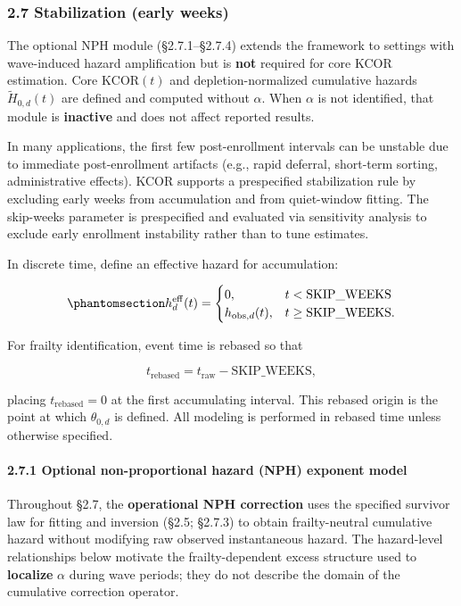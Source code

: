\documentclass[
]{article}
\begin{document}
\subsubsection{2.7 Stabilization (early weeks)}\label{stabilization-early-weeks}

The optional NPH module (§2.7.1--§2.7.4) extends the framework to settings with wave-induced hazard amplification but is \textbf{not} required for core KCOR estimation. Core \(\mathrm{KCOR}(t)\) and depletion-normalized cumulative hazards \(\tilde H_{0,d}(t)\) are defined and computed without \(\alpha\). When \(\alpha\) is not identified, that module is \textbf{inactive} and does not affect reported results.

In many applications, the first few post-enrollment intervals can be unstable due to immediate post-enrollment artifacts (e.g., rapid deferral, short-term sorting, administrative effects). KCOR supports a prespecified stabilization rule by excluding early weeks from accumulation and from quiet-window fitting. The skip-weeks parameter is prespecified and evaluated via sensitivity analysis to exclude early enrollment instability rather than to tune estimates.

In discrete time, define an effective hazard for accumulation:

\begin{equation}\protect\phantomsection\label{eq:effective-hazard-skip}{h_d^{\mathrm{eff}}(t)=
\begin{cases}
0, & t < \mathrm{SKIP\_WEEKS} \\
h_{\mathrm{obs},d}(t), & t \ge \mathrm{SKIP\_WEEKS}.
\end{cases}}\end{equation}

For frailty identification, event time is rebased so that

\[t_{\mathrm{rebased}} = t_{\mathrm{raw}} - \mathrm{SKIP\_WEEKS},\]

placing \(t_{\mathrm{rebased}}=0\) at the first accumulating interval. This rebased origin is the point at which \(\theta_{0,d}\) is defined. All modeling is performed in rebased time unless otherwise specified.

\paragraph{2.7.1 Optional non-proportional hazard (NPH) exponent model}\label{optional-non-proportional-hazard-nph-exponent-model}

Throughout §2.7, the \textbf{operational NPH correction} uses the specified survivor law for fitting and inversion (§2.5; §2.7.3) to obtain frailty-neutral cumulative hazard without modifying raw observed instantaneous hazard. The hazard-level relationships below motivate the frailty-dependent excess structure used to \textbf{localize} \(\alpha\) during wave periods; they do not describe the domain of the cumulative correction operator.
\end{document}
